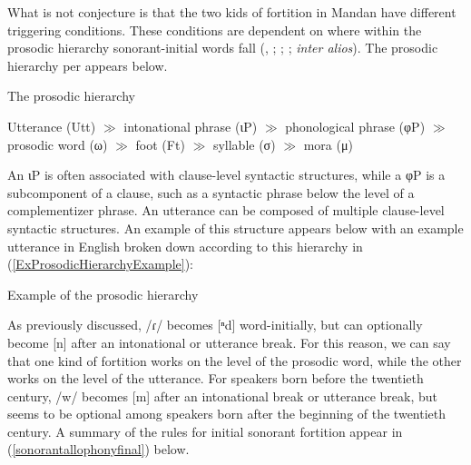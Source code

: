 What is not conjecture is that the two kids of fortition in Mandan have different triggering conditions. These conditions are dependent on where within the prosodic hierarchy sonorant-initial words fall (\citealt{selkirk1986}, \citealt{selkirk2011}; \citealt{nesporvogel1986}; \citealt{beckmanpierrehumbert1986}; \textit{inter alios}). The prosodic hierarchy per \citet[221]{nesporvogel1986} appears below.

\begin{exe}

\item The prosodic hierarchy

Utterance (Utt) $\gg$ intonational phrase (ιP) $\gg$ phonological phrase (φP) $\gg$ prosodic word (ω) $\gg$ foot (Ft) $\gg$ syllable (σ) $\gg$ mora (μ)

\end{exe}

An ιP is often associated with clause-level syntactic structures, while a φP is a subcomponent of a clause, such as a syntactic phrase below the level of a complementizer phrase. An utterance can be composed of multiple clause-level syntactic structures. An example of this structure appears below with an example utterance in English broken down according to this hierarchy in (\ref{ExProsodicHierarchyExample}):

\begin{exe}

\item\label{ExProsodicHierarchyExample} Example of the prosodic hierarchy\\


\end{exe}

As previously discussed, /ɾ/ becomes [ⁿd] word-initially, but can optionally become [n] after an intonational or utterance break. For this reason, we can say that one kind of fortition works on the level of the prosodic word, while the other works on the level of the utterance. For speakers born before the twentieth century, /w/ becomes [m] after an intonational break or utterance break, but seems to be optional among speakers born after the beginning of the twentieth century. A summary of the rules for initial sonorant fortition appear in (\ref{sonorantallophonyfinal}) below.

